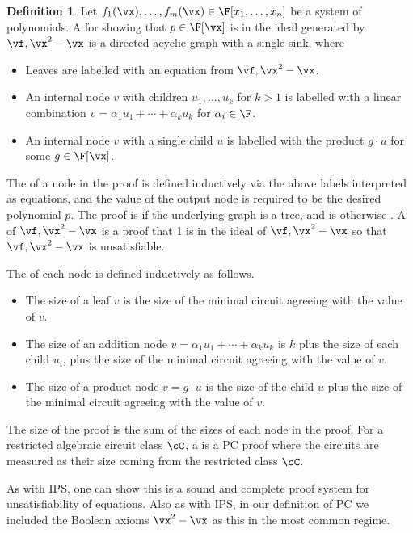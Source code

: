 \documentclass[11pt]{article}
\numberwithin{equation}{section}
\theoremstyle{definition}
\newtheorem{definition}[theorem]{Definition}
\theoremstyle{plain}
\begin{document}
\begin{definition}\label{defn:pc}
        Let $f_1(\vx),\ldots,f_m(\vx)\in\F[x_1,\ldots,x_n]$ be a system of polynomials. A  for showing that $p\in\F[\vx]$ is in the ideal generated by $\vf,\vx^2-\vx$ is a directed acyclic graph with a single sink, where
        \begin{itemize}
                \item Leaves are labelled with an equation from $\vf,\vx^2-\vx$.
                \item An internal node $v$ with children $u_1,\ldots,u_k$ for $k>1$ is labelled with a linear combination $v=\alpha_1 u_1+\cdots +\alpha_ku_k$ for $\alpha_i\in \F$.
                \item An internal node $v$ with a single child $u$ is labelled with the product $g\cdot u$ for some $g\in\F[\vx]$.
        \end{itemize}
        The  of a node in the proof is defined inductively via the above labels interpreted as equations, and the value of the output node is required to be the desired polynomial $p$.  The proof is  if the underlying graph is a tree, and is otherwise .  A  of $\vf,\vx^2-\vx$ is a proof that 1 is in the ideal of $\vf,\vx^2-\vx$ so that $\vf,\vx^2-\vx$ is unsatisfiable.

        The  of each node is defined inductively as follows.
        \begin{itemize}
                \item The size of a leaf $v$ is the size of the minimal circuit agreeing with the value of $v$.
                \item The size of an addition node $v=\alpha_1 u_1+\cdots +\alpha_ku_k$ is $k$ plus the size of each child $u_i$, plus the size of the minimal circuit agreeing with the value of $v$.
                \item The size of a product node $v=g\cdot u$ is the size of the child $u$ plus the size of the minimal circuit agreeing with the value of $v$.
        \end{itemize}
        The size of the proof is the sum of the sizes of each node in the proof. For a restricted algebraic circuit class $\cC$, a  is a PC proof where the circuits are measured as their size coming from the restricted class $\cC$.
\end{definition}

As with IPS, one can show this is a sound and complete proof system for unsatisfiability of equations.  Also as with IPS, in our definition of PC we included the Boolean axioms $\vx^2-\vx$ as this in the most common regime.
\end{document}
